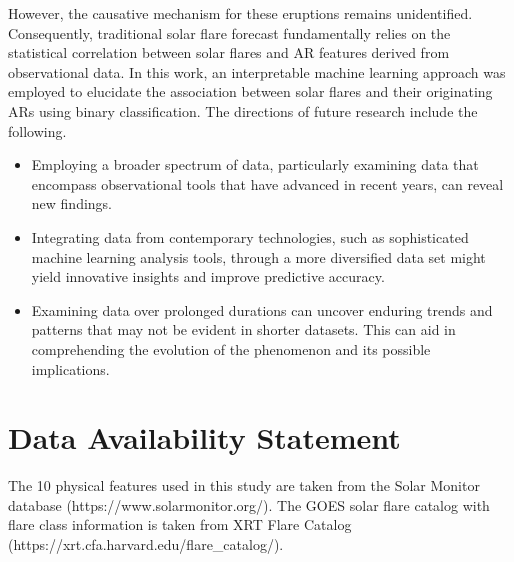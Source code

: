 \documentclass[draft]{agujournal2019}
\begin{document}
However, the causative mechanism for these eruptions remains unidentified. Consequently, traditional solar flare forecast fundamentally relies on the statistical correlation between solar flares and AR features derived from observational data. In this work, an interpretable machine learning approach was employed to elucidate the association between solar flares and their originating ARs using binary classification. 
The directions of future research include the following.
\begin{itemize}
\item Employing a broader spectrum of data, particularly examining data that encompass observational tools that have advanced in recent years, can reveal new findings.
\item Integrating data from contemporary technologies, such as sophisticated machine learning analysis tools, through a more diversified data set might yield innovative insights and improve predictive accuracy. 
\item Examining data over prolonged durations can uncover enduring trends and patterns that may not be evident in shorter datasets. This can aid in comprehending the evolution of the phenomenon and its possible implications.
\end{itemize}

\section*{Data Availability Statement}
The 10 physical features used in this study are taken from the Solar Monitor \\
database
(https://www.solarmonitor.org/).
The GOES solar flare catalog with flare class information
is taken from XRT Flare Catalog (https://xrt.cfa.harvard.edu/flare\_catalog/).

%

\end{document}
